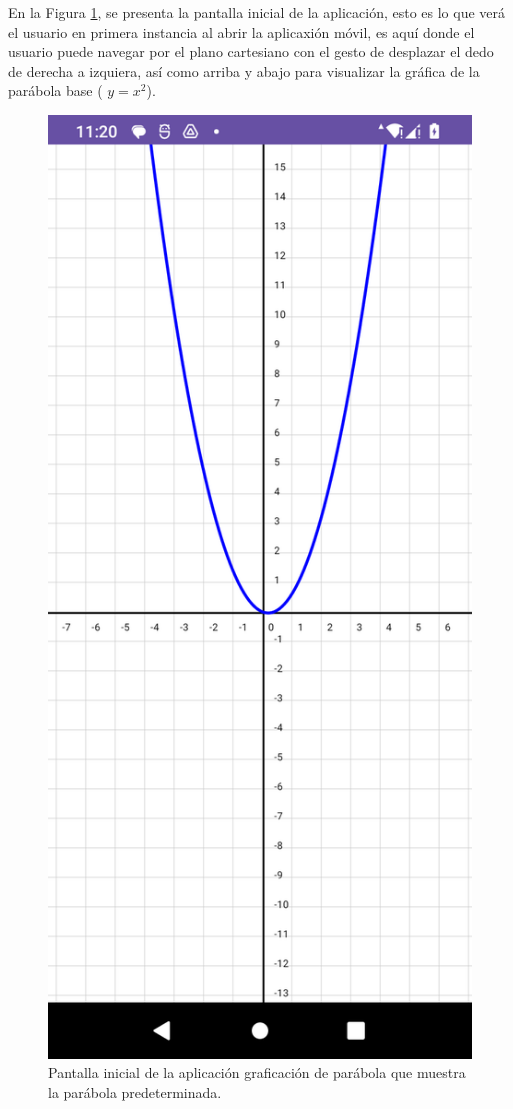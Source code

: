 \documentclass[conference]{IEEEtran}
\begin{document}
En la Figura \ref{fig1}, se presenta la pantalla inicial de la aplicación, esto es lo que verá el usuario en primera instancia al abrir la aplicaxión móvil, es aquí donde el usuario puede navegar por el plano cartesiano con el gesto de desplazar el dedo de derecha a izquiera, así como arriba y abajo para visualizar la gráfica de la parábola base ( \(y = x^2\)).
\begin{figure}[H]
    \centering
    \includegraphics[width=0.4\columnwidth]{pantalla_inicial.png}
    \caption{Pantalla inicial de la aplicación graficación de parábola que muestra la parábola predeterminada.}
    \label{fig1}
\end{figure}
\end{document}
